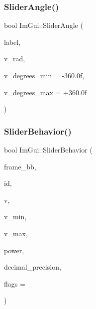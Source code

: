 \hypertarget{namespace_im_gui_ad20170a9fff4ded0076476dad8ec6645}{}\label{namespace_im_gui_ad20170a9fff4ded0076476dad8ec6645} 
\subsubsection{\texorpdfstring{Slider\+Angle()}{SliderAngle()}}
{\footnotesize\ttfamily bool Im\+Gui\+::\+Slider\+Angle (\begin{DoxyParamCaption}\item[{const char $\ast$}]{label,  }\item[{float $\ast$}]{v\+\_\+rad,  }\item[{float}]{v\+\_\+degrees\+\_\+min = {\ttfamily -\/360.0f},  }\item[{float}]{v\+\_\+degrees\+\_\+max = {\ttfamily +360.0f} }\end{DoxyParamCaption})}

\hypertarget{namespace_im_gui_a3d3b2964eeba76dadaa532232c23fc97}{}\label{namespace_im_gui_a3d3b2964eeba76dadaa532232c23fc97} 
\subsubsection{\texorpdfstring{Slider\+Behavior()}{SliderBehavior()}}
{\footnotesize\ttfamily bool Im\+Gui\+::\+Slider\+Behavior (\begin{DoxyParamCaption}\item[{const \hyperlink{struct_im_rect}{Im\+Rect} \&}]{frame\+\_\+bb,  }\item[{Im\+Gui\+ID}]{id,  }\item[{float $\ast$}]{v,  }\item[{float}]{v\+\_\+min,  }\item[{float}]{v\+\_\+max,  }\item[{float}]{power,  }\item[{int}]{decimal\+\_\+precision,  }\item[{Im\+Gui\+Slider\+Flags}]{flags = {} }\end{DoxyParamCaption})}

\hypertarget{namespace_im_gui_a7c12e66f74025376996b7ac6d1e3a476}{}\label{namespace_im_gui_a7c12e66f74025376996b7ac6d1e3a476} 
